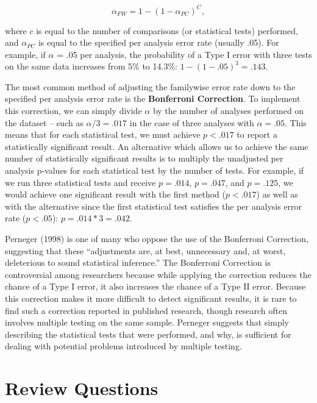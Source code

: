 \documentclass[]{book}
\begin{document}
\[ \alpha_{FW} = 1 - (1 - \alpha_{PC})^C,  \]

where \(c\) is equal to the number of comparisons (or statistical tests) performed, and \(\alpha_{PC}\) is equal to the specified per analysis error rate (usually .05). For example, if \(\alpha\) = .05 per analysis, the probability of a Type I error with three tests on the same data increases from 5\% to 14.3\%: \(1 - (1 - .05)^3 = .143\).

The most common method of adjusting the familywise error rate down to the specified per analysis error rate is the \textbf{Bonferroni Correction}. To implement this correction, we can simply divide \(\alpha\) by the number of analyses performed on the dataset -- such as \(\alpha / 3 = .017\) in the case of three analyses with \(\alpha = .05\). This means that for each statistical test, we must achieve \(p < .017\) to report a statistically significant result. An alternative which allows us to achieve the same number of statistically significant results is to multiply the unadjusted per analysis p-values for each statistical test by the number of tests. For example, if we run three statistical tests and receive \(p = .014\), \(p = .047\), and \(p = .125\), we would achieve one significant result with the first method (\(p < .017\)) as well as with the alternative since the first statistical test satisfies the per analysis error rate (\(p < .05\)): \(p = .014 * 3 = .042\).

Perneger (1998) is one of many who oppose the use of the Bonferroni Correction, suggesting that these ``adjustments are, at best, unnecessary and, at worst, deleterious to sound statistical inference.'' The Bonferroni Correction is controversial among researchers because while applying the correction reduces the chance of a Type I error, it also increases the chance of a Type II error. Because this correction makes it more difficult to detect significant results, it is rare to find such a correction reported in published research, though research often involves multiple testing on the same sample. Perneger suggests that simply describing the statistical tests that were performed, and why, is sufficient for dealing with potential problems introduced by multiple testing.

\hypertarget{review-questions-4}{%
\section{Review Questions}\label{review-questions-4}}
\end{document}
